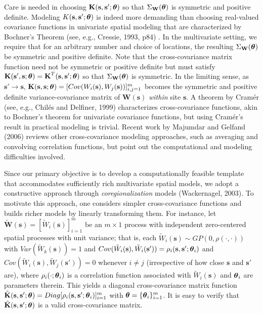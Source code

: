 \documentclass[a4paper]{article}
\newcommand{\btheta}{ \mbox{\boldmath $ \theta $} }
\newcommand{\bK}{\textbf{K}}
\newcommand{\bs}{\textbf{s}}
\newcommand{\bW}{\textbf{W}}
\begin{document}
Care is needed in choosing $\bK(\bs,\bs';\btheta)$ so that
$\Sigma_{\bW}(\btheta)$ is symmetric and positive definite. Modeling
$K(\bs,\bs';\btheta)$ is indeed more demanding than choosing
real-valued covariance functions in univariate spatial modeling that
are characterized by Bochner's Theorem (see, e.g., Cressie, 1993, p84)  .
In the multivariate setting, we require that for an arbitrary number
and choice of locations, the resulting $\Sigma_{\bW}(\btheta)$ be
symmetric and positive definite. Note that the cross-covariance
matrix function need not be symmetric or positive definite but must
satisfy $\bK(\bs',\bs;\btheta) = \bK^{T}(\bs,\bs';\btheta)$ so that
$\Sigma_{\bW}(\btheta)$ is symmetric. In the limiting sense, as
$\bs'\to \bs$,
$\bK(\bs,\bs;\btheta)=[Cov(W_i(\bs),W_j(\bs))]_{i,j=1}^{m}$ becomes
the symmetric and positive definite variance-covariance matrix of
$\bW(\bs)$ \emph{within} site $\bs$. A theorem by Cram\'er (see,
e.g., Chil\'es and Delfiner, 1999) characterizes cross-covariance functions, akin
to Bochner's theorem for univariate covariance functions, but using
Cram\'er's result in practical modeling is trivial. Recent work
by Majumdar and Gelfand (2006) reviews other cross-covariance modeling approaches,
such as averaging and convolving correlation functions, but point
out the computational and modeling difficulties involved.

Since our primary objective is to develop a computationally feasible
template that accommodates sufficiently rich multivariate spatial
models, we adopt a constructive approach through \emph{coregionalization} models (Wackernagel, 2003).
To motivate this approach, one considers simpler cross-covariance
functions and builds richer models by linearly transforming them.
For instance, let $\tilde{\bW}(\bs)=[\tilde{W}_i(\bs)]_{i=1}^{m}$ be
an $m\times 1$ process with independent zero-centered spatial
processes with unit variance; that is, each $\tilde{W}_i(\bs)\sim
GP(0,\rho(\cdot,\cdot))$ with $Var(\tilde{W}_k(\bs))=1$ and
$Cov(\tilde{W}_i(\bs),\tilde{W}_i(\bs'))=\rho_i(\bs,\bs';\btheta_i)$
and $Cov(\tilde{W}_i(\bs),\tilde{W}_{j}(\bs'))=0$ whenever $i\neq j$
(irrespective of how close $\bs$ and $\bs'$ are), where
$\rho_i(\cdot;\btheta_i)$ is a correlation function associated with
$\tilde{W}_i(\bs)$ and $\btheta_i$ are parameters therein. This
yields a diagonal cross-covariance matrix function
$\tilde{\bK}(\bs,\bs';\btheta)=Diag[\rho_i(\bs,\bs';\btheta_i)]_{i=1}^{m}$
with $\btheta = \{\btheta_i\}_{i=1}^{m}$. It is easy to verify that
$\tilde{\bK}(\bs,\bs';\btheta)$ is a valid cross-covariance matrix.
\end{document}
